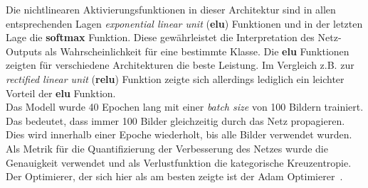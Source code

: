Die nichtlinearen Aktivierungsfunktionen in dieser Architektur sind in allen
entsprechenden Lagen \textit{exponential linear unit} (\textbf{elu}) Funktionen und in der letzten Lage die
\textbf{softmax} Funktion. Diese gewährleistet die Interpretation des
Netz-Outputs als Wahrscheinlichkeit für eine bestimmte Klasse.
Die \textbf{elu} Funktionen zeigten für verschiedene Architekturen die beste
Leistung. Im Vergleich z.B. zur \textit{rectified linear unit} (\textbf{relu}) Funktion zeigte sich allerdings
lediglich ein leichter Vorteil der \textbf{elu} Funktion.\\
Das Modell wurde 40 Epochen lang mit einer \textit{batch size} von 100 Bildern
trainiert. Das bedeutet, dass immer 100 Bilder gleichzeitig durch das Netz
propagieren. Dies wird innerhalb einer Epoche wiederholt, bis alle Bilder
verwendet wurden. Als Metrik für die Quantifizierung der Verbesserung des
Netzes wurde die Genauigkeit verwendet und als Verlustfunktion die
kategorische Kreuzentropie. Der Optimierer, der sich hier als am besten zeigte
ist der Adam Optimierer~\cite{Adam}.

